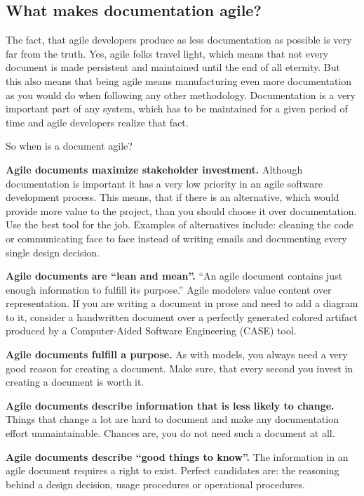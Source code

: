 \subsection{What makes documentation agile?}
The fact, that agile developers produce as less documentation as possible is
very far from the truth. Yes, agile folks travel light, which means that not
every document is made persistent and maintained until the end of all eternity.
But this also means that being agile means manufacturing even more documentation
as you would do when following any other methodology. Documentation is a very
important part of any system, which has to be maintained for a given period of
time and agile developers realize that fact.

So when is a document agile?
\begin{description}
\item {\bf Agile documents maximize stakeholder investment.} Although
documentation is important it has a very low priority in an agile software
development process. This means, that if there is an alternative, which would
provide more value to the project, than you should choose it over documentation.
Use the best tool for the job. Examples of alternatives include: cleaning the
code or communicating face to face instead of writing emails and documenting
every single design decision.
\item {\bf Agile documents are \enquote{lean and mean}.} \enquote{An agile
document contains just enough information to fulfill its purpose.}\cite{Ambler200204} Agile modelers value
content over representation. If you are writing a document in prose and need to
add a diagram to it, consider a handwritten document over a perfectly generated
colored artifact produced by a Computer-Aided Software Engineering (CASE) tool.
\item {\bf Agile documents fulfill a purpose.} As with models, you always need
a very good reason for creating a document. Make sure, that every second you
invest in creating a document is worth it.
\item {\bf Agile documents describe information that is less likely to change.}
Things that change a lot are hard to document and make any documentation effort
unmaintainable. Chances are, you do not need such a document at all.
\item {\bf Agile documents describe \enquote{good things to know}.} The
information in an agile document requires a right to exist. Perfect candidates are: the
reasoning behind a design decision, usage procedures or operational procedures.

\end{description}
